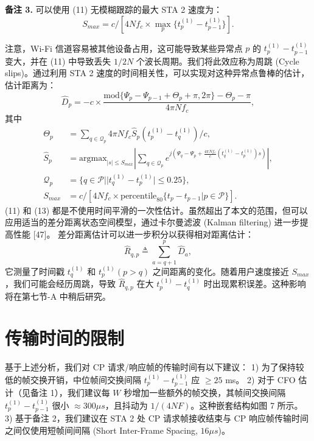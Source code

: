 \documentclass[journal]{IEEEtran}
\begin{document}
\textbf{备注 3.} 可以使用 (11) 无模糊跟踪的最大 STA 2 速度为：
\begin{equation}
S_{max} = c / [4N f_c \times \max_p \{t_p^{(1)} - t_{p-1}^{(1)}\}]. \label{eq:12}
\end{equation}

注意，Wi-Fi 信道容易被其他设备占用，这可能导致某些异常点 $p$ 的 $t_p^{(1)} - t_{p-1}^{(1)}$ 变大，并在 (11) 中导致丢失 $1/2N$ 个波长周期。我们将此效应称为周跳 (Cycle slips)。通过利用 STA 2 速度的时间相关性，可以实现对这种异常点鲁棒的估计，估计距离为：
\begin{equation}
\hat{D}_p = -c \times \frac{\text{mod} \{ \Psi_p - \Psi_{p-1} + \Theta_p + \pi, 2\pi \} - \Theta_p - \pi}{4\pi N f_c}, \label{eq:13}
\end{equation}
其中
\begin{align*}
\Theta_p &= \sum_{q \in \mathcal{Q}_p} 4\pi N f_c \hat{S}_p (t_p^{(1)} - t_q^{(1)})/c, \\
\hat{S}_p &= \text{argmax}_{|s| \le S_{max}} \left| \sum_{q \in \mathcal{Q}_p} e^{j(\Psi_q - \Psi_p + \frac{4\pi N f_c}{c}(t_q^{(1)} - t_p^{(1)})s)} \right|, \\
\mathcal{Q}_p &= \{q \in \mathcal{P} | |t_q^{(1)} - t_p^{(1)}| \le 0.25\}, \\
S_{max} &= c / [4N f_c \times \text{percentile}_{80} \{t_p - t_{p-1} | p \in \mathcal{P}\}].
\end{align*}
(11) 和 (13) 都是不使用时间平滑的一次性估计。虽然超出了本文的范围，但可以应用适当的差分距离状态空间模型，通过卡尔曼滤波 (Kalman filtering) 进一步提高性能 [47]。
差分距离估计可以进一步积分以获得相对距离估计：
\begin{equation}
\hat{R}_{q,p} \triangleq \sum_{a=q+1}^{p} \hat{D}_a, \label{eq:14}
\end{equation}
它测量了时间戳 $t_q^{(1)}$ 和 $t_p^{(1)} (p > q)$ 之间距离的变化。随着用户速度接近 $S_{max}$，我们可能会经历周跳，导致 $\hat{R}_{q,p}$ 在大 $t_p^{(1)} - t_q^{(1)}$ 时出现累积误差。这种影响将在第七节-A 中稍后研究。

\section{传输时间的限制}
基于上述分析，我们对 CP 请求/响应帧的传输时间有以下建议：
1) 为了保持较低的帧交换开销，中位帧间交换间隔 $t_p^{(1)} - t_{p-1}^{(1)}$ 应 $\ge 25$ ms。
2) 对于 CFO 估计（见备注 1），我们建议每 $W$ 秒增加一些额外的帧交换，其帧间交换间隔 $t_p^{(1)} - t_{p-1}^{(1)}$ 很小 $\approx 300 \mu s$，且抖动为 $1/(4NF)$。这种嵌套结构如图 7 所示。
3) 基于备注 2，我们建议在 STA 2 处 CP 请求帧接收结束与 CP 响应帧传输时间之间仅使用短帧间间隔 (Short Inter-Frame Spacing, $16 \mu s$)。
\end{document}
